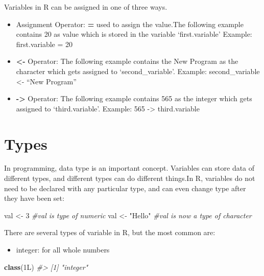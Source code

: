 \documentclass[
]{book}
\newenvironment{Shaded}{\begin{snugshade}}{\end{snugshade}}
\newcommand{\CommentTok}[1]{\textcolor[rgb]{0.56,0.35,0.01}{\textit{#1}}}
\newcommand{\DecValTok}[1]{\textcolor[rgb]{0.00,0.00,0.81}{#1}}
\newcommand{\FunctionTok}[1]{\textcolor[rgb]{0.13,0.29,0.53}{\textbf{#1}}}
\newcommand{\NormalTok}[1]{#1}
\newcommand{\OtherTok}[1]{\textcolor[rgb]{0.56,0.35,0.01}{#1}}
\newcommand{\StringTok}[1]{\textcolor[rgb]{0.31,0.60,0.02}{#1}}
\providecommand{\tightlist}{%
  \setlength{\itemsep}{0pt}\setlength{\parskip}{0pt}}
\begin{document}
Variables in R can be assigned in one of three ways.

\begin{itemize}
\item
  Assignment Operator: \textbf{=} used to assign the value.The following example contains 20 as value which is stored in the variable `first.variable' Example: first.variable = 20
\item
  \textbf{\textless-} Operator: The following example contains the New Program as the character which gets assigned to `second\_variable'.
  Example: second\_variable \textless- ``New Program''
\item
  \textbf{-\textgreater{}} Operator: The following example contains 565 as the integer which gets assigned to `third.variable'.
  Example: 565 -\textgreater{} third.variable
\end{itemize}

\hypertarget{types}{%
\section{Types}\label{types}}

In programming, data type is an important concept. Variables can store data of different types, and different types can do different things.In R, variables do not need to be declared with any particular type, and can even change type after they have been set:

\begin{Shaded}
\begin{Highlighting}[]
\NormalTok{val }\OtherTok{\textless{}{-}} \DecValTok{3} \CommentTok{\#val is type of numeric}
\NormalTok{val }\OtherTok{\textless{}{-}} \StringTok{"Hello"} \CommentTok{\#val is now a type of character}
\end{Highlighting}
\end{Shaded}

There are several types of variable in R, but the most common are:

\begin{itemize}
\tightlist
\item
  integer: for all whole numbers
\end{itemize}

\begin{Shaded}
\begin{Highlighting}[]
\FunctionTok{class}\NormalTok{(1L)}
\CommentTok{\#\textgreater{} [1] "integer"}
\end{Highlighting}
\end{Shaded}
\end{document}
